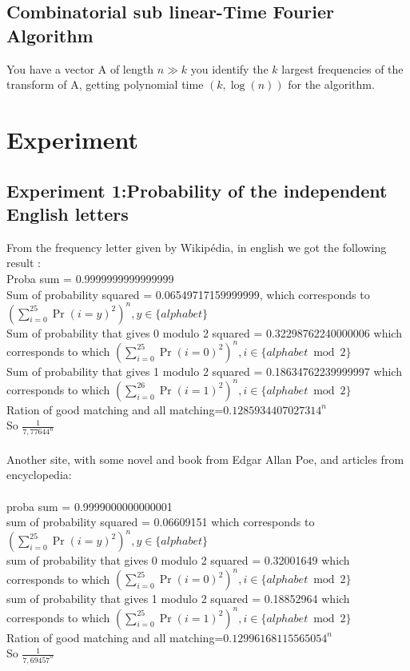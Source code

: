 \documentclass{article}
\begin{document}
\subsection{Combinatorial sub linear-Time Fourier Algorithm}

You have a vector A of length $n \gg k$ you identify the $k$ largest frequencies of the transform of A, getting polynomial time $(k,\log(n))$ for the algorithm.\\

\section{Experiment}

\subsection{Experiment 1:Probability of the independent English letters}
From the frequency letter given by Wikip\'edia, in english we got the following result :\\
Proba sum = 0.9999999999999999\\
Sum of probability squared = 0.06549717159999999, which corresponds to $(\sum_{i=0}^{25}{\Pr(i=y)^2})^n, y \in \{alphabet\} $\\
Sum of probability that gives 0 modulo 2 squared  = 0.32298762240000006 which corresponds to which $(\sum_{i=0}^{25}{\Pr(i=0)^2})^n, i \in \{alphabet \bmod 2\} $\\
Sum of probability that gives 1 modulo 2 squared = 0.18634762239999997 which corresponds to which $(\sum_{i=0}^{26}{\Pr(i=1)^2})^n, i \in \{alphabet \bmod 2\} $\\
Ration of good matching and all matching=$0.1285934407027314^n$\\
So $\frac{1}{7,77644^n}$
\\
\\
Another site, with some novel and book from Edgar Allan Poe, and articles from encyclopedia:\\
\\
proba sum = 0.9999000000000001\\
sum of probability squared = 0.06609151 which corresponds to $(\sum_{i=0}^{25}{\Pr(i=y)^2})^n, y \in \{alphabet\} $\\
sum of probability that gives 0 modulo 2 squared = 0.32001649 which corresponds to which $(\sum_{i=0}^{25}{\Pr(i=0)^2})^n, i \in \{alphabet \bmod 2\} $\\
sum of probability that gives 1 modulo 2 squared = 0.18852964 which corresponds to which $(\sum_{i=0}^{25}{\Pr(i=1)^2})^n, i \in \{alphabet \bmod 2\} $\\
Ration of good matching and all matching=$0.12996168115565054^n$\\
So $\frac{1}{7,69457^n}$
\end{document}
